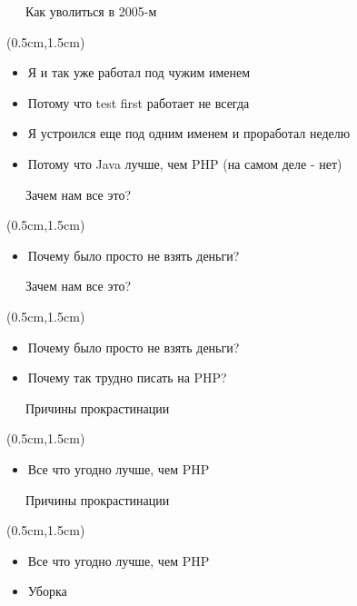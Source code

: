 \documentclass[xetex,18pt,aspectratio=43]{beamer}
\begin{document}
\begin{Large}
\begin{frame}{\ \ \ Как уволиться в 2005-м}
\begin{textblock*}{\framewidth-0.8cm}(0.5cm,1.5cm)
\begin{itemize}
  \item Я и так уже работал под чужим именем
  \item Потому что test first работает не всегда
  \item Я устроился еще под одним именем и проработал неделю
  \item Потому что Java лучше, чем PHP (на самом деле - нет)
\end{itemize}
\end{textblock*}
\end{frame}

\begin{frame}{\ \ \ Зачем нам все это?}
\begin{textblock*}{\framewidth-0.8cm}(0.5cm,1.5cm)
\begin{itemize}
  \item Почему было просто не взять деньги?
\end{itemize}
\end{textblock*}
\end{frame}

\begin{frame}{\ \ \ Зачем нам все это?}
\begin{textblock*}{\framewidth-0.8cm}(0.5cm,1.5cm)
\begin{itemize}
  \item Почему было просто не взять деньги?
  \item Почему так трудно писать на PHP?
\end{itemize}
\end{textblock*}
\end{frame}

\begin{frame}{\ \ \ Причины прокрастинации}
\begin{textblock*}{\framewidth-0.8cm}(0.5cm,1.5cm)
\begin{itemize}
  \item Все что угодно лучше, чем PHP
\end{itemize}
\end{textblock*}
\end{frame}

\begin{frame}{\ \ \ Причины прокрастинации}
\begin{textblock*}{\framewidth-0.8cm}(0.5cm,1.5cm)
\begin{itemize}
  \item Все что угодно лучше, чем PHP
  \item Уборка
\end{itemize}
\end{textblock*}
\end{frame}


\end{Large}
\end{document}
